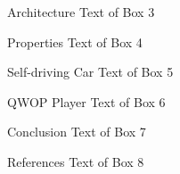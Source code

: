 \documentclass[a0paper,portrait]{baposter}
\begin{document}
\begin{poster}
\begin{posterbox}[name=arch,column=1]{Architecture}
Text of Box 3
\end{posterbox}

\begin{posterbox}[name=props,column=1,below=arch]{Properties}
Text of Box 4
\end{posterbox}

\begin{posterbox}[name=car,column=1,below=props]{Self-driving Car}
Text of Box 5
\end{posterbox}

\begin{posterbox}[name=qwop,column=2]{QWOP Player}
Text of Box 6
\end{posterbox}

\begin{posterbox}[name=conclusion,column=2,below=qwop]{Conclusion}
Text of Box 7
\end{posterbox}

\begin{posterbox}[name=ref,column=2,below=conclusion]{References}
Text of Box 8
\end{posterbox}

\end{poster}
\end{document}
